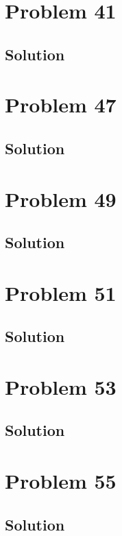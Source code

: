 \documentclass[12pt]{article}
\begin{document}
    \section{Problem 41}

        \subsection{Solution}

    \pagebreak
    \section{Problem 47}

        \subsection{Solution}

    \pagebreak
    \section{Problem 49}

        \subsection{Solution}

    \pagebreak
    \section{Problem 51}

        \subsection{Solution}

    \pagebreak
    \section{Problem 53}

        \subsection{Solution}

    \pagebreak
    \section{Problem 55}

        \subsection{Solution}
\end{document}
